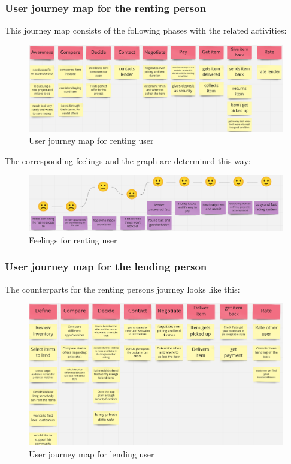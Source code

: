 		\subsubsection{User journey map for the renting person}
			This journey map consists of the following phases with the related activities:
			
			\begin{figure}[H]
				\centering
				\includegraphics[width=\linewidth]{abb/2_context_of_use/user_journey_map_renting.png}
				\caption{User journey map for renting user}
				\label{fig:ujm_renting}
			\end{figure}
			
			\noindent
			The corresponding feelings and the graph are determined this way:
			
			\begin{figure}[H]
				\centering
				\includegraphics[width=\linewidth]{abb/2_context_of_use/feelings_renting.png}
				\caption{Feelings for renting user}
				\label{fig:ujm_renting_feelings}
			\end{figure}
		
		\pagebreak
		\subsubsection{User journey map for the lending person}
			The counterparts for the renting persons journey looks like this:
			
			\begin{figure}[H]
				\centering
				\includegraphics[width=\linewidth]{abb/2_context_of_use/user_journey_map_lending.png}
				\caption{User journey map for lending user}
				\label{fig:ujm_lending}
			\end{figure}
		
